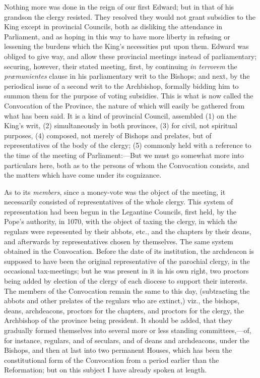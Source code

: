 Nothing more was done in the
reign of our first Edward; but in that of his grandson the clergy
resisted. They resolved they would not grant subsidies to the King
except in provincial Councils, both as disliking the attendance in
Parliament, and as hoping in this way to have more liberty in refusing
or lessening the burdens which the King's necessities put upon them.
Edward was obliged to give way, and allow these provincial meetings
instead of parliamentary; securing, however, their stated meeting,
first, by continuing \emph{in terrorem} the \emph{præmunientes}
clause in his parliamentary writ to the Bishops; and next, by the
periodical issue of a second writ to the Archbishop, formally bidding
him to summon them for the purpose of voting subsidies. This is what
is now called the Convocation of the Province, the nature of which
will easily be gathered from what has been said. It is a kind of
provincial Council, assembled (1) on the King's writ, (2)
simultaneously in both provinces, (3) for civil, not spiritual
purposes, (4) composed, not merely of Bishops and prelates, but
of representatives of the body of the clergy; (5) commonly held with a
reference to the time of the meeting of Parliament:—But we must go
somewhat more into particulars here, both as to the persons of whom
the Convocation consists, and the matters which have come under its
cognizance.

As to its \emph{members},
since a money-vote was the object of the meeting, it necessarily
consisted of representatives of the whole clergy. This system of
representation had been begun in the Legantine Councils, first held,
by the Pope's authority, in 1070, with the object of taxing the
clergy, in which the regulars were represented by their abbots, etc.,
and the chapters by their deans, and afterwards by representatives
chosen by themselves. The same system obtained in the Convocation.
Before the date of its institution, the archdeacon is supposed to have
been the original representative of the parochial clergy, in the
occasional tax-meetings; but he was present in it in his own right,
two proctors being added by election of the clergy of each diocese to
support their interests. The members of the Convocation remain the
same to this day, (subtracting the abbots and other prelates of the
regulars who are extinct,) viz., the bishops, deans, archdeacons,
proctors for the chapters, and proctors for the clergy, the Archbishop
of the province being president. It should be added, that they
gradually formed themselves into several more or less standing
committees,—of, for instance, regulars, and of seculars, and of
deans and archdeacons, under the Bishops, and then at last into two
permanent Houses, which has been the constitutional form of the
Convocation from a period earlier than the Reformation; but on this
subject I have already spoken at length.

